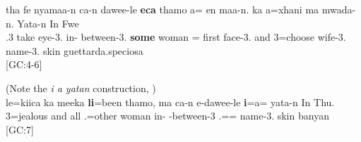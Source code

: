 \ea\label{ex:t4-6}
\gll tha fe nyamaa-n ca-n dawee-le \textbf{eca} thamo a= en maa-n. ka a=xhani ma mwada-n.
Yata-n In Fwe\\
 .3 take eye-3. in- between-3. \textbf{some} woman = first face-3. and 3=choose  wife-3. name-3. skin guettarda.speciosa \\
\glt {}	{[GC:4-6]}
\z

\ea\label{ex:t7}%
(Note the \textit{i a yatan} construction, )\\
\gll le=kiica ka meeka \textbf{li}=been thamo, ma ca-n e-dawee-le \textbf{i}=a= yata-n In Thu.	\\
 3=jealous and all .=other woman  in- -between-3 .== name-3. skin banyan\\
\glt {} {[}GC:7]	
\z


